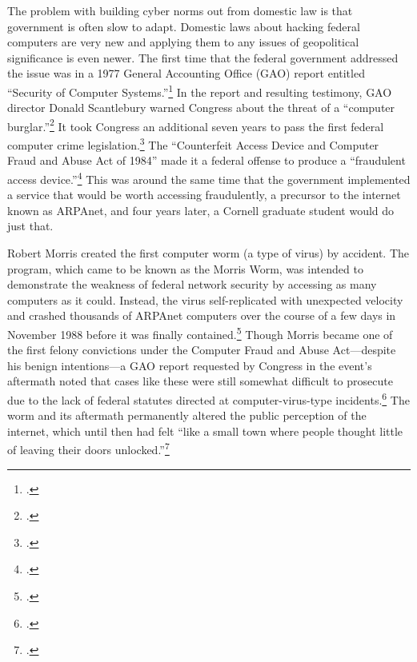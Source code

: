 \documentclass{memoir}
\begin{document}
\begin{refsegment}
The problem with building cyber norms out from domestic law is that government is often slow to adapt. Domestic laws about hacking federal computers are very new and applying them to any issues of geopolitical significance is even newer. The first time that the federal government addressed the issue was in a 1977 General Accounting Office (GAO) report entitled ``Security of Computer Systems.''\footcite{washington_post_staff_timeline_2003} In the report and resulting testimony, GAO director Donald Scantlebury warned Congress about the threat of a ``computer burglar.''\footcite{u.s._government_accounting_office_security_1977} It took Congress an additional seven years to pass the first federal computer crime legislation.\footcite[The later bill cited here, the Computer Security Act of 1987, describes the 1984 bill as being the first federal legislation in this area.]{glickman_computer_1988} The ``Counterfeit Access Device and Computer Fraud and Abuse Act of 1984'' made it a federal offense to produce a ``fraudulent access device.''\footcite{hughes_access_1984} This was around the same time that the government implemented a service that would be worth accessing fraudulently, a precursor to the internet known as ARPAnet, and four years later, a Cornell graduate student would do just that.

Robert Morris created the first computer worm (a type of virus) by accident. The program, which came to be known as the Morris Worm, was intended to demonstrate the weakness of federal network security by accessing as many computers as it could. Instead, the virus self-replicated with unexpected velocity and crashed thousands of ARPAnet computers over the course of a few days in November 1988 before it was finally contained.\footcite[This source, a master's thesis for the USAF Air University, makes the dramatic and completely unsubstantiated claim that the Morris worm infected half of of ARPAnet's 88,000 computers. The more popular (and plausible) claim is that of the roughly 60,000 ARPAnet-connected computers, the worm infected 10\% of them, though that number is not particularly well substantiated either.]{moore_conception_2014} Though Morris became one of the first felony convictions under the Computer Fraud and Abuse Act---despite his benign intentions---a GAO report requested by Congress in the event's aftermath noted that cases like these were still somewhat difficult to prosecute due to the lack of federal statutes directed at computer-virus-type incidents.\footcite{u._s._government_accounting_office_computer_1989} The worm and its aftermath permanently altered the public perception of the internet, which until then had felt ``like a small town where people thought little of leaving their doors unlocked.''\footcite{lee_how_2013}


\end{refsegment}
\end{document}
